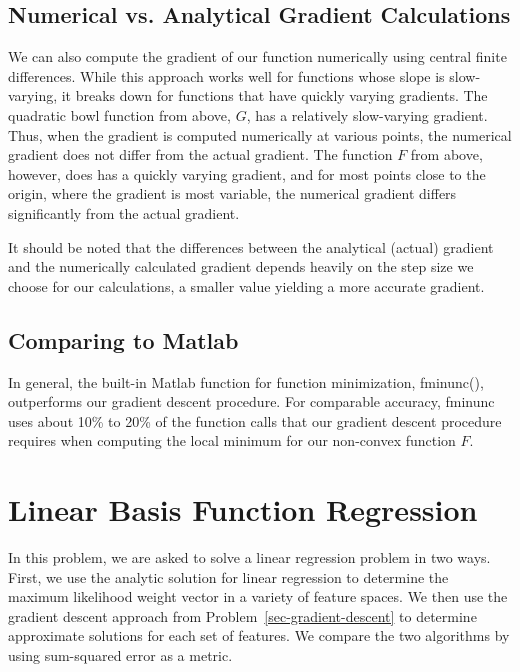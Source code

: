 \documentclass[10pt]{article}   %
\theoremstyle{plain}
\begin{document}
\subsection{Numerical vs. Analytical Gradient Calculations}
We can also compute the gradient of our function numerically using central finite differences. While this approach works well for functions whose slope is slow-varying, it breaks down for functions that have quickly varying gradients. The quadratic bowl function from above, $G$, has a relatively slow-varying gradient. Thus, when the gradient is computed numerically at various points, the numerical gradient does not differ from the actual gradient. The function $F$ from above, however, does has a quickly varying gradient, and for most points close to the origin, where the gradient is most variable, the numerical gradient differs significantly from the actual gradient. 

It should be noted that the differences between the analytical (actual) gradient and the numerically calculated gradient depends heavily on the step size we choose for our calculations, a smaller value yielding a more accurate gradient.

\subsection{Comparing to Matlab}
In general, the built-in Matlab function for function minimization, fminunc(), outperforms our gradient descent procedure. For comparable accuracy, fminunc uses about 10\% to 20\% of the function calls that our gradient descent procedure requires when computing the local minimum for our non-convex function $F$.

\section{Linear Basis Function Regression}\label{sec-basis}
In this problem, we are asked to solve a linear regression problem in two ways. First, we use the analytic solution for linear regression to determine the maximum likelihood weight vector in a variety of feature spaces. We then use the gradient descent approach from Problem~\ref{sec-gradient-descent} to determine approximate solutions for each set of features. We compare the two algorithms by using sum-squared error as a metric.
\end{document}
